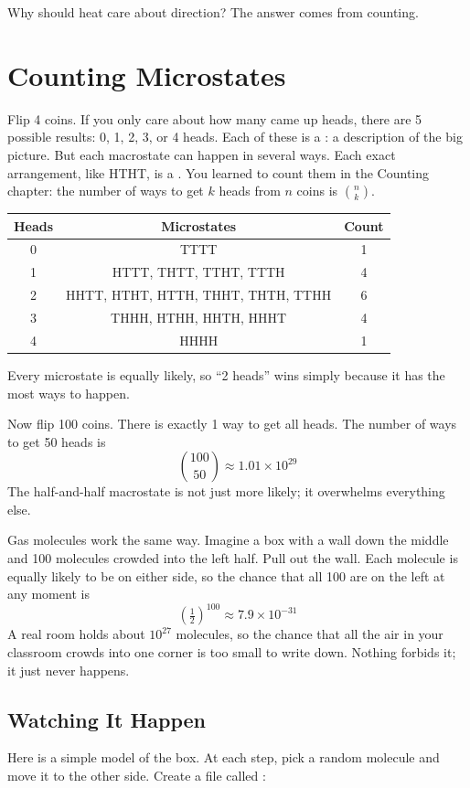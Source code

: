 Why should heat care about direction? The answer comes from counting.

\section{Counting Microstates}
Flip 4 coins. If you only care about how many came up heads, there are 5 possible results: 0, 1,
2, 3, or 4 heads. Each of these is a : a description of the big picture. But each
macrostate can happen in several ways. Each exact arrangement, like HTHT, is a
. You learned to count them in the Counting chapter: the number of ways to get
$k$ heads from $n$ coins is $\binom{n}{k}$.

\begin{center}
\begin{tabular}{c|c|c}
Heads & Microstates & Count \\
\hline
0 & TTTT & 1 \\
1 & HTTT, THTT, TTHT, TTTH & 4 \\
2 & HHTT, HTHT, HTTH, THHT, THTH, TTHH & 6 \\
3 & THHH, HTHH, HHTH, HHHT & 4 \\
4 & HHHH & 1 \\
\end{tabular}
\end{center}

Every microstate is equally likely, so ``2 heads'' wins simply because it has the most ways to
happen.

Now flip 100 coins. There is exactly 1 way to get all heads. The number of ways to get 50 heads is
$$\binom{100}{50} \approx 1.01 \times 10^{29}$$
The half-and-half macrostate is not just more likely; it overwhelms everything else.

Gas molecules work the same way. Imagine a box with a wall down the middle and 100 molecules
crowded into the left half. Pull out the wall. Each molecule is equally likely to be on either side,
so the chance that all 100 are on the left at any moment is
$$\left(\tfrac{1}{2}\right)^{100} \approx 7.9 \times 10^{-31}$$
A real room holds about $10^{27}$ molecules, so the chance that all the air in your classroom
crowds into one corner is too small to write down. Nothing forbids it; it just never happens.

\subsection{Watching It Happen}
Here is a simple model of the box. At each step, pick a random molecule and move it to the other
side. Create a file called :

